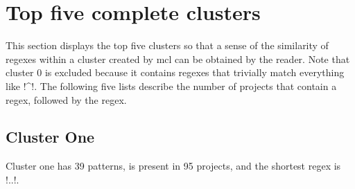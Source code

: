 \section*{Top five complete clusters}
\label{sec:top5CompleteClusters}

This section displays the top five clusters so that a sense of the similarity of regexes within a cluster created by mcl can be obtained by the reader.  Note that cluster 0 is excluded because it contains regexes that trivially match everything like \cverb!^!.  The following five lists describe the number of projects that contain a regex, followed by the regex.

\subsection*{Cluster One}
Cluster one has 39 patterns, is present in 95 projects, and the shortest regex is \cverb!..!.
